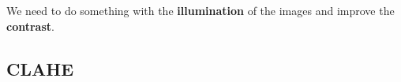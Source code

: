\documentclass{beamer}
\begin{document}
\begin{frame}
        We need to do something with the \textbf{illumination} of the images and improve the \textbf{contrast}.
\end{frame}
\subsection*{CLAHE}

\end{document}

